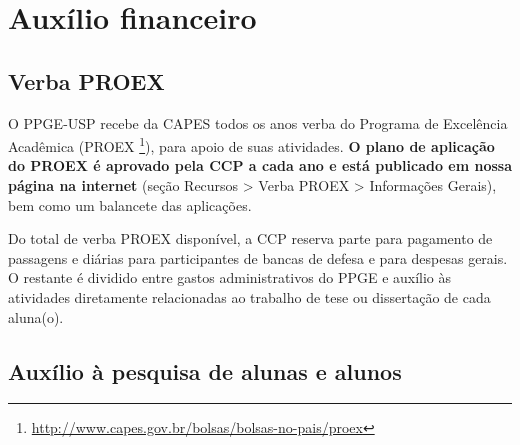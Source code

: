 \documentclass[twoside a4paper 12pt]{report}
\begin{document}

\section{Auxílio financeiro}

\subsection{Verba PROEX}

O PPGE-USP recebe da CAPES todos os anos verba do Programa de Excelência Acadêmica (PROEX \footnote{\url{http://www.capes.gov.br/bolsas/bolsas-no-pais/proex}}), para apoio de suas atividades. \textbf{O plano de aplicação do PROEX é aprovado pela CCP a cada ano e está publicado em nossa página na internet} (seção Recursos \textgreater{} Verba PROEX \textgreater{} Informações Gerais), bem como um balancete das aplicações.

Do total de verba PROEX disponível, a CCP reserva parte para pagamento de passagens e diárias para participantes de bancas de defesa e para despesas gerais. O restante é dividido entre gastos administrativos do PPGE e auxílio às atividades diretamente relacionadas ao trabalho de tese ou dissertação de cada aluna(o).

\subsection{Auxílio à pesquisa de alunas e alunos
}\label{auxilio-pesquisa-de-alunas-e-alunos}
\end{document}
